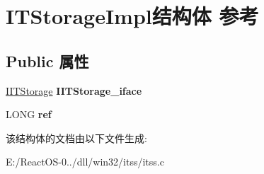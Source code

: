\hypertarget{struct_i_t_storage_impl}{}\section{I\+T\+Storage\+Impl结构体 参考}
\label{struct_i_t_storage_impl}
\subsection*{Public 属性}
\begin{DoxyCompactItemize}
\item 
\mbox{\label{struct_i_t_storage_impl_a9e8990bc2ea79a39ec2797b74b253936}} 
\hyperlink{interface_i_i_t_storage}{I\+I\+T\+Storage} {\bfseries I\+I\+T\+Storage\+\_\+iface}
\item 
\mbox{\label{struct_i_t_storage_impl_ab52e78db7c35fa6295cfe442aa7801ae}} 
L\+O\+NG {\bfseries ref}
\end{DoxyCompactItemize}


该结构体的文档由以下文件生成\+:\begin{DoxyCompactItemize}
\item 
E\+:/\+React\+O\+S-\/0../dll/win32/itss/itss.\+c\end{DoxyCompactItemize}
